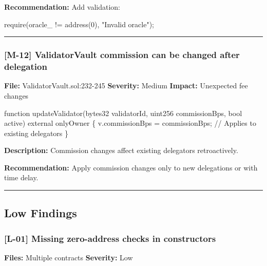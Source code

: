\documentclass[
]{article}
\newenvironment{Shaded}{}{}
\newcommand{\NormalTok}[1]{#1}
\begin{document}
\textbf{Recommendation:} Add validation:

\begin{Shaded}
\begin{Highlighting}[]
\NormalTok{require(oracle\_ != address(0), "Invalid oracle");}
\end{Highlighting}
\end{Shaded}

\begin{center}\rule{0.5\linewidth}{0.5pt}\end{center}

\subsubsection{{[}M-12{]} ValidatorVault commission can be changed after
delegation}\label{m-12-validatorvault-commission-can-be-changed-after-delegation}

\textbf{File:} ValidatorVault.sol:232-245 \textbf{Severity:} Medium
\textbf{Impact:} Unexpected fee changes

\begin{Shaded}
\begin{Highlighting}[]
\NormalTok{function updateValidator(bytes32 validatorId, uint256 commissionBps, bool active) external onlyOwner \{}
\NormalTok{    v.commissionBps = commissionBps;  // Applies to existing delegators}
\NormalTok{\}}
\end{Highlighting}
\end{Shaded}

\textbf{Description:} Commission changes affect existing delegators
retroactively.

\textbf{Recommendation:} Apply commission changes only to new
delegations or with time delay.

\begin{center}\rule{0.5\linewidth}{0.5pt}\end{center}

\subsection{Low Findings}\label{low-findings}

\subsubsection{{[}L-01{]} Missing zero-address checks in
constructors}\label{l-01-missing-zero-address-checks-in-constructors}

\textbf{Files:} Multiple contracts \textbf{Severity:} Low
\end{document}
